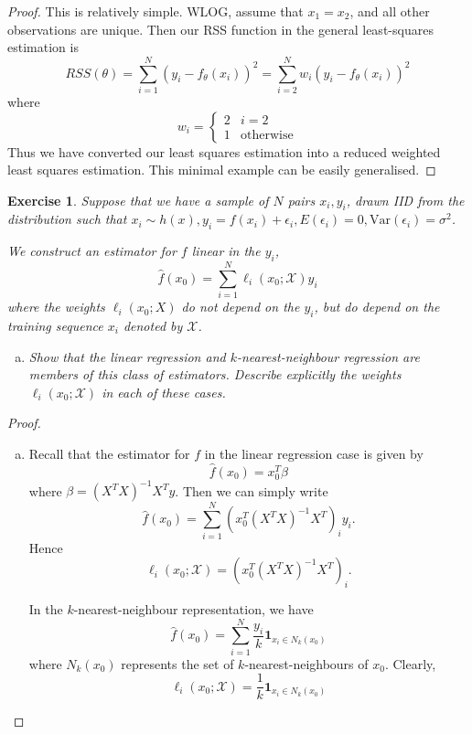 \documentclass[12pt]{amsart}
\theoremstyle{plain}%
\newtheorem{exer}[thm]{Exercise}
\theoremstyle{definition}
\theoremstyle{remark}
\begin{document}
\begin{proof}
    This is relatively simple.  WLOG, assume that $x_1 = x_2$, and all other observations are unique.  Then our RSS function in the general least-squares estimation is \[
        RSS(\theta) = \sum_{i=1}^N \left(y_i - f_\theta(x_i) \right)^2 = \sum_{i=2}^N w_i \left(y_i - f_\theta(x_i) \right)^2 
    \] where \[
        w_i = \begin{cases}
            2 & i = 2 \\
            1 & \text{otherwise}
        \end{cases}
    \]
    Thus we have converted our least squares estimation into a reduced weighted least squares estimation.  This minimal example can be easily generalised.
\end{proof}

\begin{exer}
    Suppose that we have a sample of $N$ pairs $x_i, y_i$, drawn IID from the distribution such that $x_i \sim h(x), y_i = f(x_i) + \epsilon_i, E(\epsilon_i) = 0, \text{Var}(\epsilon_i) = \sigma^2$.
    
    We construct an estimator for $f$ linear in the $y_i$, \[
        \hat f(x_0) = \sum_{i=1}^N \ell_i(x_0; \mathcal X) y_i
    \] where the weights $\ell_i(x_0; X)$ do not depend on the $y_i$, but do depend on the training sequence $x_i$ denoted by $\mathcal X$.  
    \begin{enumerate}[(a)]
        \item Show that the linear regression and $k$-nearest-neighbour regression are members of this class of estimators.  Describe explicitly the weights $\ell_i(x_0; \mathcal X)$ in each of these cases.
    \end{enumerate}
\end{exer}

\begin{proof}
    \begin{enumerate}[(a)]
        \item Recall that the estimator for $f$ in the linear regression case is given by \[
            \hat f(x_0) = x_0^T \beta 
        \] where $\beta = (X^T X)^{-1} X^T y$.  Then we can simply write \[
            \hat f(x_0) = \sum_{i=1}^N \left( x_0^T (X^T X)^{-1} X^T \right)_i y_i.
        \]  Hence \[
            \ell_i(x_0; \mathcal X) = \left( x_0^T (X^T X)^{-1} X^T \right)_i.
        \]
        
        In the $k$-nearest-neighbour representation, we have \[
            \hat f(x_0) = \sum_{i=1}^N \frac{y_i}{k} \mathbf{1}_{x_i \in N_k(x_0)}
        \] where $N_k(x_0)$ represents the set of $k$-nearest-neighbours of $x_0$.  Clearly, \[
            \ell_i(x_0; \mathcal X) = \frac{1}{k} \mathbf{1}_{x_i \in N_k(x_0)}
        \]
    \end{enumerate}
\end{proof}
\end{document}
